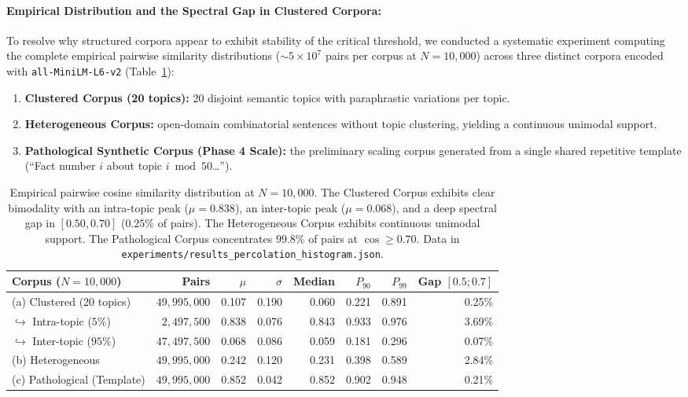 \documentclass[11pt,a4paper]{article}
\theoremstyle{definition}
\begin{document}
\paragraph{Empirical Distribution and the Spectral Gap in Clustered Corpora:}
To resolve why structured corpora appear to exhibit stability of the critical threshold, we conducted a systematic experiment computing the complete empirical pairwise similarity distributions ($\sim 5 \times 10^7$ pairs per corpus at $N = 10{,}000$) across three distinct corpora encoded with \texttt{all-MiniLM-L6-v2} (Table~\ref{tab:sim_histograms}):
\begin{enumerate}[label=(\alph*)]
    \item \textbf{Clustered Corpus (20 topics):} 20 disjoint semantic topics with paraphrastic variations per topic.
    \item \textbf{Heterogeneous Corpus:} open-domain combinatorial sentences without topic clustering, yielding a continuous unimodal support.
    \item \textbf{Pathological Synthetic Corpus (Phase 4 Scale):} the preliminary scaling corpus generated from a single shared repetitive template (``Fact number $i$ about topic $i \bmod 50$\dots'').
\end{enumerate}

\begin{table}[h]
\centering
\small
\begin{tabular}{lrrrrrrr}
\toprule
\textbf{Corpus ($N=10{,}000$)} & \textbf{Pairs} & $\mu$ & $\sigma$ & \textbf{Median} & $P_{90}$ & $P_{99}$ & \textbf{Gap $[0.5; 0.7]$} \\
\midrule
(a) Clustered (20 topics) & $49{,}995{,}000$ & 0.107 & 0.190 & 0.060 & 0.221 & 0.891 & 0.25\% \\
\quad $\hookrightarrow$ Intra-topic ($5\%$) & $2{,}497{,}500$ & 0.838 & 0.076 & 0.843 & 0.933 & 0.976 & 3.69\% \\
\quad $\hookrightarrow$ Inter-topic ($95\%$) & $47{,}497{,}500$ & 0.068 & 0.086 & 0.059 & 0.181 & 0.296 & 0.07\% \\
(b) Heterogeneous & $49{,}995{,}000$ & 0.242 & 0.120 & 0.231 & 0.398 & 0.589 & 2.84\% \\
(c) Pathological (Template) & $49{,}995{,}000$ & 0.852 & 0.042 & 0.852 & 0.902 & 0.948 & 0.21\% \\
\bottomrule
\end{tabular}
\caption{Empirical pairwise cosine similarity distribution at $N = 10{,}000$. The Clustered Corpus exhibits clear bimodality with an intra-topic peak ($\mu = 0.838$), an inter-topic peak ($\mu = 0.068$), and a deep spectral gap in $[0.50, 0.70]$ ($0.25\%$ of pairs). The Heterogeneous Corpus exhibits continuous unimodal support. The Pathological Corpus concentrates $99.8\%$ of pairs at $\cos \ge 0.70$. Data in \texttt{experiments/results\_percolation\_histogram.json}.}
\label{tab:sim_histograms}
\end{table}
\end{document}
